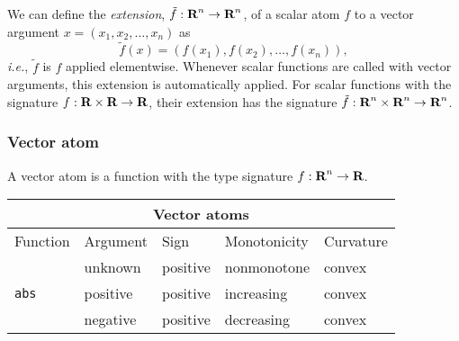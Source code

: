 \documentclass[11pt]{article}
\newcommand{\ie}{{\it i.e.}}
\newcommand{\reals}{{\mbox{\bf R}}}
\begin{document}
We can define the \emph{extension}, $\tilde f : \reals^n \to \reals^n$, 
of a scalar atom $f$ to a vector argument $x = (x_1, x_2, \ldots, x_n)$ as
\[
\tilde f(x) = \left( f(x_1), f(x_2), \ldots, f(x_n) \right),
\]
\ie, $\tilde f$ is $f$ applied elementwise.
Whenever scalar functions are called with vector arguments, this extension
is automatically applied. For scalar functions with the signature 
$f : \reals \times \reals \to \reals$, their extension has the signature
$\tilde f : \reals^n \times \reals^n \to \reals^n$.

\subsubsection{Vector atom}
A vector atom is a function with the type signature $f : \reals^n \to \reals$.

\begin{table}
  \centering
\begin{tabular}{|l|l||l|l|l|} \hline  
  \multicolumn{5}{|c|}{Vector atoms} \\ \hline
  Function & Argument & Sign & Monotonicity & Curvature \\ \hline
  \multirow{3}{*}{\tt abs} & unknown & positive & nonmonotone & convex \\
  & positive & positive & increasing & convex \\
  & negative & positive & decreasing & convex \\ \hline
\end{tabular}
\end{table}
\end{document}
